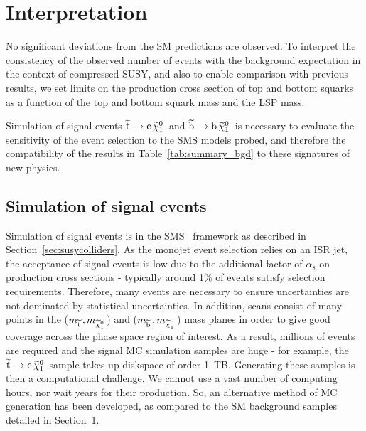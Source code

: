 %
\section{Interpretation} 
\label{sec:GEN}

No significant deviations from the \ac{SM} predictions are observed. 
To interpret the consistency of the observed number of events with
the background expectation in the context of compressed \ac{SUSY}, and also to
enable comparison with previous results, we set limits on the production cross section of top and bottom squarks as a function of the top and bottom squark mass and the LSP mass. 

Simulation of signal events 
$\widetilde{{\rm t}}\,\rightarrow{\rm c}\,\widetilde{\chi}^{0}_{1}\,$ and 
$\widetilde{{\rm b}}\,\rightarrow{\rm b}\,\widetilde{\chi}^{0}_{1}\,$ is necessary to evaluate the sensitivity of the event selection to the \ac{SMS} models probed, and therefore the compatibility of the results in Table~\ref{tab:summary_bgd} to these signatures of new physics.

\subsection{Simulation of signal events}

Simulation of signal events is in the \ac{SMS}~\cite{bib:SMS} framework as described in Section~\ref{sec:susycolliders}. 
As the monojet event selection relies on an \ac{ISR} jet, the acceptance of signal events is low due to the additional factor of $\alpha_s$ on production cross sections - typically around 1\% of events satisfy selection requirements. 
Therefore, many events are necessary to ensure uncertainties are not dominated by statistical uncertainties. 
In addition, scans consist of many points in the ($m_{\widetilde{{\rm t}}\,}, m_{\widetilde{\chi}^{0}_{1}\,}$) and ($m_{\widetilde{{\rm b}}\,}, m_{\widetilde{\chi}^{0}_{1}\,}$) mass planes in order to give good coverage across the phase space region of interest. 
As a result, millions of events are required and the signal MC simulation samples are huge - for example, the $\widetilde{{\rm t}}\, \rightarrow {\rm c}\, \widetilde{\chi}^{0}_{1}\,$ sample takes up diskspace of order 1~TB.
Generating these samples is then a computational challenge. 
We cannot use a vast number of computing hours, nor wait years for their production. 
So, an alternative method of MC generation has been developed, as compared to the \ac{SM} background samples detailed in Section~\ref{sec:GEN}.

